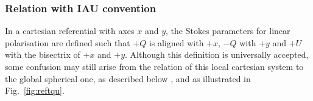 \documentclass[12pt,twoside]{article}
\begin{document}


\subsubsection{Relation with IAU convention}
In a cartesian referential with axes $x$ and $y$, the Stokes parameters for
linear polarisation are defined such that $+Q$ is aligned with $+x$, $-Q$ with $+y$ and $+U$ with the
bisectrix of $+x$ and $+y$. Although this definition is universally accepted, 
some confusion may still arise from the relation of
this local cartesian system to the global spherical one, as described below
\citep{hamakerleahy}, and as illustrated in Fig.~\ref{fig:reftqu}. %
\end{document}
